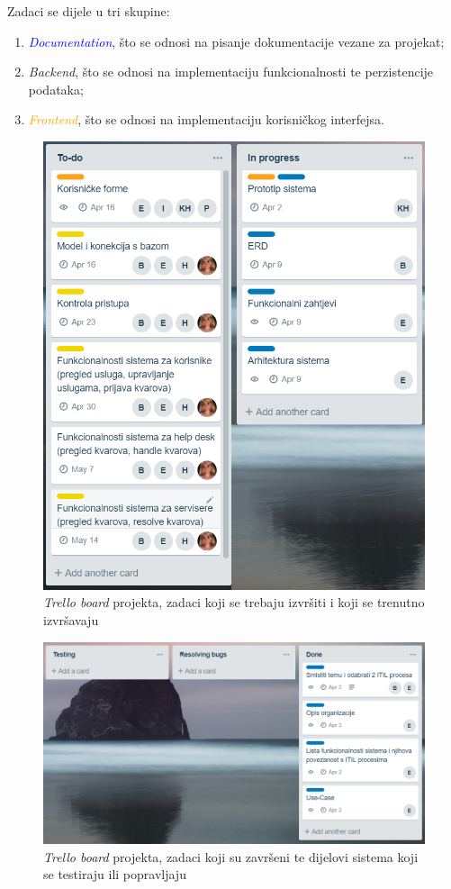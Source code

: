 \documentclass[12pt,a4paper]{article}
\begin{document}
Zadaci se dijele u tri skupine:
\begin{enumerate}
\item \textcolor{blue}{\textit{Documentation}}, što se odnosi na pisanje dokumentacije vezane za projekat;
\item \textcolor{amber}{\textit{Backend}}, što se odnosi na implementaciju funkcionalnosti te perzistencije podataka;
\item \textcolor{orange}{\textit{Frontend}}, što se odnosi na implementaciju korisničkog interfejsa.
\end{enumerate}

\begin{figure}[H]
\center
\includegraphics[scale=0.6]{../res/trello1.PNG}
\caption{\textit{Trello board} projekta, zadaci koji se trebaju izvršiti i koji se trenutno izvršavaju}
\label{trello1}
\end{figure}

\begin{figure}[H]
\center
\includegraphics[scale=0.6]{../res/trello2.PNG}
\caption{\textit{Trello board} projekta, zadaci koji su završeni te dijelovi sistema koji se testiraju ili popravljaju}
\label{trello2}
\end{figure}
\end{document}
